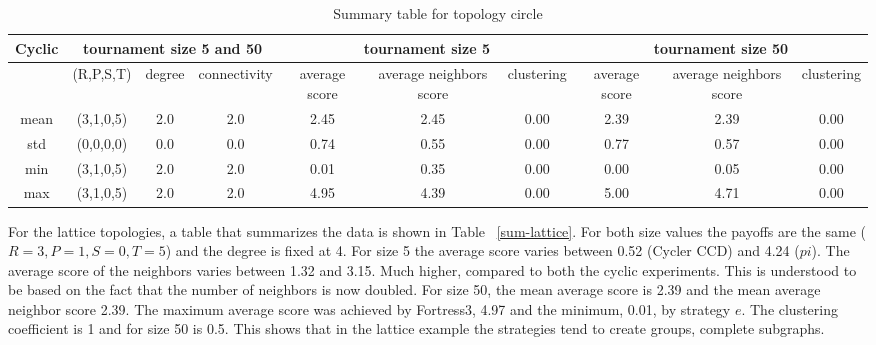 \begin{table}[!hbtp]
	\centering
	\begin{adjustbox}{width=1\textwidth, height=0.15\textwidth}
		\small
		\begin{tabular}{cccccccccc}
				\toprule
			Cyclic & \multicolumn{3}{|c|}{tournament size 5 and 50} & \multicolumn{3}{c|}{tournament size 5} & \multicolumn{3}{c}{tournament size 50}                             \\\midrule

			     & (R,P,S,T) & degree & connectivity & average score & average neighbors score & clustering & average score & average neighbors score & clustering \\\midrule
			mean & (3,1,0,5) & 2.0    & 2.0          & 2.45          & 2.45                    & 0.00       & 2.39          & 2.39                    & 0.00       \\\midrule
			std  & (0,0,0,0) & 0.0    & 0.0          & 0.74          & 0.55                    & 0.00       & 0.77          & 0.57                    & 0.00       \\\midrule
			min  & (3,1,0,5) & 2.0    & 2.0          & 0.01          & 0.35                    & 0.00       & 0.00          & 0.05                    & 0.00       \\\midrule
			max  & (3,1,0,5) & 2.0    & 2.0          & 4.95          & 4.39                    & 0.00       & 5.00          & 4.71                    & 0.00       \\ \bottomrule
		\end{tabular}
	\end{adjustbox}
	\caption{Summary table for topology circle}
	\label{sum-cicle}
\end{table}

For the lattice topologies, a table that summarizes the data is shown in Table
~\ref{sum-lattice}. For both size values the payoffs are the same (\(R=3, P=1,
S=0, T=5\)) and the degree is fixed at 4. For size 5 the average score
varies between 0.52 (Cycler CCD) and 4.24 ($pi$). The average score of the neighbors
varies between 1.32 and 3.15. Much higher, compared to both the cyclic experiments.
This is understood to be based on the fact that the number of neighbors is now
doubled. For size 50, the mean average score is 2.39 and the mean average neighbor
score 2.39. The maximum average score was achieved by Fortress3, 4.97 and the
minimum, 0.01, by strategy $e$. The clustering coefficient is 1 and for size
50 is 0.5. This shows that in the lattice example the strategies tend to create
groups, complete subgraphs.


